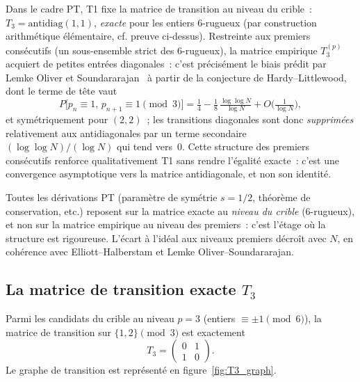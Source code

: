 \documentclass[12pt,a4paper]{article}
\begin{document}
\begin{remarque}
\label{rem:T0_scope}
Dans le cadre PT, T1 fixe la matrice de transition au niveau du
crible~: $T_3 = \mathrm{antidiag}(1,1)$, \emph{exacte} pour les
entiers $6$-rugueux (par construction arithmétique élémentaire, cf.
preuve ci-dessus). Restreinte aux premiers consécutifs (un
sous-ensemble strict des $6$-rugueux), la matrice empirique $T_3^{(p)}$
acquiert de petites entrées diagonales~: c'est précisément le biais
prédit par Lemke Oliver et
Soundararajan~\cite{LemkeOliverSoundararajan2016} à partir de la
conjecture de Hardy--Littlewood, dont le terme de tête vaut
\begin{equation}
  P\bigl[p_n \equiv 1,\, p_{n+1} \equiv 1 \pmod 3\bigr]
   = \tfrac{1}{4} - \tfrac{1}{8}\,\tfrac{\log\log N}{\log N}
     + O\!\bigl(\tfrac{1}{\log N}\bigr),
  \label{eq:LOS_diag}
\end{equation}
et symétriquement pour $(2,2)$~; les transitions diagonales sont donc
\emph{supprimées} relativement aux antidiagonales par un terme
secondaire $(\log\log N)/(\log N)$ qui tend vers~$0$. Cette structure
des premiers consécutifs renforce qualitativement T1 sans rendre
l'égalité exacte~: c'est une convergence asymptotique vers la matrice
antidiagonale, et non son identité.

Toutes les dérivations PT (paramètre de symétrie $s = 1/2$, théorème
de conservation, etc.) reposent sur la matrice exacte au \emph{niveau
du crible} ($6$-rugueux), et non sur la matrice empirique au niveau
des premiers~: c'est l'étage où la structure est rigoureuse. L'écart
à l'idéal aux niveaux premiers décroît avec $N$, en cohérence avec
Elliott--Halberstam et Lemke Oliver--Soundararajan.
\end{remarque}

\subsection{La matrice de transition exacte $T_3$}
\label{sec:T3}

\mTHM
\begin{theoreme}
\label{thm:T3}
Parmi les candidats du crible au niveau $p = 3$ (entiers
$\equiv \pm 1 \pmod 6$), la matrice de transition sur
$\{1, 2\} \pmod 3$ est exactement
\begin{equation}
  T_3 = \begin{pmatrix} 0 & 1 \\ 1 & 0 \end{pmatrix}.
  \label{eq:T3}
\end{equation}
Le graphe de transition est représenté en figure~\ref{fig:T3_graph}.
\end{theoreme}
\end{document}
